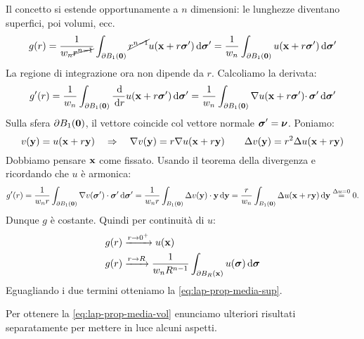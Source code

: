\begin{dimostrazione}
    Il concetto si estende opportunamente a $n$ dimensioni: le lunghezze diventano superfici, poi volumi, ecc.
    \begin{equation*}
        g(r) =\frac{1}{w_{n}\cancel{r^{n-1}}}\int _{\partial B_{1}(\mathbf{0})}\cancel{r^{n-1}} u(\mathbf{x} +r\bm{\sigma} ') \,\mathrm d \bm{\sigma} '=\frac{1}{w_{n}}\int _{\partial B_{1}(\mathbf{0})} u(\mathbf{x} +r\bm{\sigma} ') \,\mathrm d \bm{\sigma} '
    \end{equation*}
    La regione di integrazione ora non dipende da $r$. Calcoliamo la derivata:
    \begin{equation*}
        g'(r) =\frac{1}{w_{n}}\int _{\partial B_{1}(\mathbf{0})}\frac{\,\mathrm d}{\,\mathrm d r} u(\mathbf{x} +r\bm{\sigma} ') \,\mathrm d \bm{\sigma} '=\frac{1}{w_{n}}\int _{\partial B_{1}(\mathbf{0})} \nabla u(\mathbf{x} +r\bm{\sigma} ') \cdotp \bm{\sigma} '\,\mathrm d \bm{\sigma} '
    \end{equation*}
    Sulla sfera $\displaystyle \partial B_{1}(\mathbf{0})$, il vettore coincide col vettore normale $\displaystyle \bm{\sigma} '=\bm{\nu}$.
    Poniamo:
    \begin{equation*}
        v(\mathbf{y})=u(\mathbf{x}+r\mathbf{y}) \quad \Rightarrow \quad \nabla v(\mathbf{y})=r\nabla u(\mathbf{x}+r\mathbf{y})\qquad \Delta v(\mathbf{y})=r^2 \Delta u(\mathbf{x}+r\mathbf{y})
    \end{equation*}
    Dobbiamo pensare $\mathbf{x}$ come fissato. Usando il teorema della divergenza e ricordando che $u$ è armonica:
    \begin{equation*}
        g'(r) =\frac{1}{w_{n}r}\int _{\partial B_{1}(\mathbf{0})} \nabla  v(\bm{\sigma}') \cdot \bm{\sigma}' \,\mathrm d \bm{\sigma}' =\frac{1}{w_{n}r}\int _{B_{1}(\mathbf{0})} \Delta   v(\mathbf{y}) \cdot \mathbf{y} \,\mathrm d \mathbf{y}   =\frac{r}{w_{n}}\int _{B_{1}(\mathbf{0})} \Delta u(\mathbf{x} +r\mathbf{y}) \,\mathrm d \mathbf{y}\overset{\Delta u=0}{=} 0.
    \end{equation*}
    Dunque $g$ è costante. Quindi per continuità di $u$:
    \begin{align*}
        g(r) & \xrightarrow{r\rightarrow 0^{+}} u(\mathbf{x})                                                       \\
        g(r) & \xrightarrow{r\rightarrow R}\frac{1}{w_{n} R^{n-1}}\int _{\partial B_{R}(\mathbf{x})} u(\bm{\sigma}) \,\mathrm d \bm{\sigma}
    \end{align*}
    Eguagliando i due termini otteniamo la \eqref{eq:lap-prop-media-sup}.

    Per ottenere la \eqref{eq:lap-prop-media-vol} enunciamo ulteriori risultati separatamente per mettere in luce alcuni aspetti.
\end{dimostrazione}

